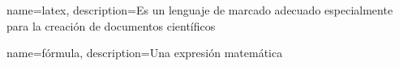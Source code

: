 {
    name=latex,
    description={Es un lenguaje de marcado adecuado especialmente para la creación de documentos científicos}
} 
 
{
    name=fórmula,
    description={Una expresión matemática} 
}
